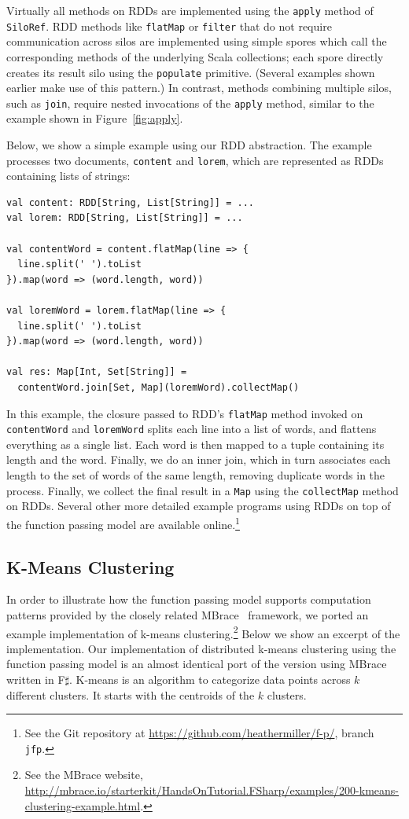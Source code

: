 \documentclass{jfp1}
\begin{document}
Virtually all methods on RDDs are implemented using the \verb|apply|
method of \verb|SiloRef|. RDD methods like \verb|flatMap| or
\verb|filter| that do not require communication across silos are
implemented using simple spores which call the corresponding methods
of the underlying Scala collections; each spore directly creates its
result silo using the \verb|populate| primitive. (Several examples
shown earlier make use of this pattern.) In contrast, methods
combining multiple silos, such as \verb|join|, require nested
invocations of the \verb|apply| method, similar to the example shown
in Figure~\ref{fig:apply}.

Below, we show a simple example using our RDD abstraction. The example
processes two documents, \verb|content| and \verb|lorem|, which are
represented as RDDs containing lists of strings:

\begin{lstlisting}
val content: RDD[String, List[String]] = ...
val lorem: RDD[String, List[String]] = ...

val contentWord = content.flatMap(line => {
  line.split(' ').toList
}).map(word => (word.length, word))

val loremWord = lorem.flatMap(line => {
  line.split(' ').toList
}).map(word => (word.length, word))

val res: Map[Int, Set[String]] =
  contentWord.join[Set, Map](loremWord).collectMap()
\end{lstlisting}
\noindent
In this example, the closure passed to RDD's \verb|flatMap| method
invoked on \verb|contentWord| and \verb|loremWord| splits each line
into a list of words, and flattens everything as a single list. Each
word is then mapped to a tuple containing its length and the
word. Finally, we do an inner join, which in turn associates each
length to the set of words of the same length, removing duplicate
words in the process. Finally, we collect the final result in a
\verb|Map| using the \verb|collectMap| method on RDDs. Several other
more detailed example programs using RDDs on top of the function
passing model are available online.\footnote{See the Git repository at
  \url{https://github.com/heathermiller/f-p/}, branch \texttt{jfp}.}

\subsection{K-Means Clustering}\label{sec:mbrace}

In order to illustrate how the function passing model supports
computation patterns provided by the closely related MBrace~\cite{MBrace} framework,
we ported an example implementation of k-means
clustering.\footnote{See the MBrace website,
  \url{http://mbrace.io/starterkit/HandsOnTutorial.FSharp/examples/200-kmeans-clustering-example.html}.}
Below we show an excerpt of the implementation. Our implementation of
distributed k-means clustering using the function passing model is an
almost identical port of the version using MBrace written in
F$\sharp$. K-means is an algorithm to categorize data points across
$k$ different clusters. It starts with the centroids of the $k$
clusters.
\end{document}
